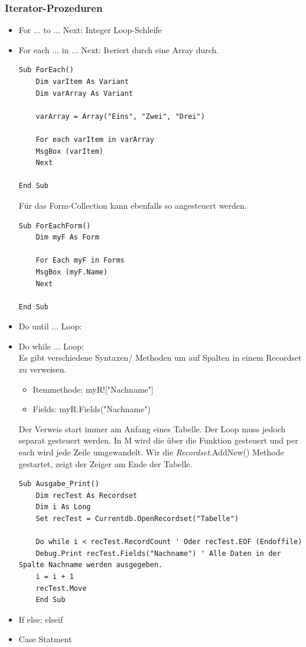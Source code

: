 \subsubsection{Iterator-Prozeduren} 
\begin{itemize} 
\item For ... to ... Next: Integer Loop-Schleife 
\item For each ... in ... Next: Iteriert durch eine Array durch. 
\begin{lstlisting}[style=VBA]
Sub ForEach()
	Dim varItem As Variant
	Dim varArray As Variant
	
	varArray = Array("Eins", "Zwei", "Drei")
	
	For each varItem in varArray
	MsgBox (varItem)
	Next	

End Sub
\end{lstlisting}   
Für das Form-Collection kann ebenfalls so angesteuert werden.
\begin{lstlisting}[style=VBA]
Sub ForEachForm()
	Dim myF As Form
	
	For Each myF in Forms
	MsgBox (myF.Name)
	Next

End Sub
\end{lstlisting} 
\item Do until ... Loop: 
\item Do while ... Loop: \\ Es gibt verschiedene Syntaxen/ Methoden um auf Spalten in einem Recordset zu verweisen.
\begin{itemize}
\item Itemmethode: myR!["Nachname"]
\item Fields: myR.Fields("Nachname")
\end{itemize}
Der Verweis start immer am Anfang eines Tabelle. Der Loop muss jedoch separat gesteuert werden. In M wird die über die Funktion gesteuert und per each wird jede Zeile umgewandelt. Wir die \textit{Recordset}.AddNew() Methode gestartet, zeigt der Zeiger am Ende der Tabelle.
\begin{lstlisting}[style=VBA]
Sub Ausgabe_Print()	
	Dim recTest As Recordset
	Dim i As Long 
	Set recTest = Currentdb.OpenRecordset("Tabelle")
	
	Do while i < recTest.RecordCount ' Oder recTest.EOF (Endoffile)
	Debug.Print recTest.Fields("Nachname") ' Alle Daten in der Spalte Nachname werden ausgegeben.
	i = i + 1
	recTest.Move
	End Sub
\end{lstlisting} 
 \item If else; elseif
 \item Case Statment
\end{itemize}
